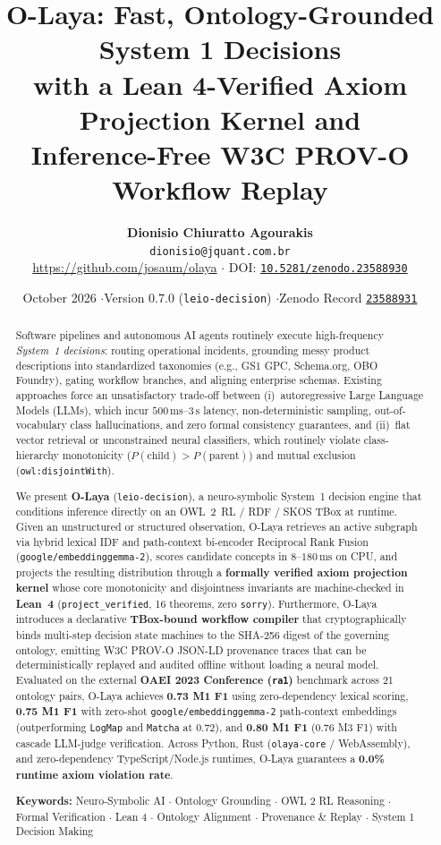 \documentclass[11pt,a4paper]{article}
\title{\textbf{O-Laya: Fast, Ontology-Grounded System 1 Decisions\\with a Lean 4-Verified Axiom Projection Kernel and\\Inference-Free W3C PROV-O Workflow Replay}}
\author{
  \textbf{Dionisio Chiuratto Agourakis}\\
  \texttt{dionisio@jquant.com.br}\\
  \url{https://github.com/josaum/olaya} $\cdot$ DOI: \href{https://doi.org/10.5281/zenodo.23588930}{\texttt{10.5281/zenodo.23588930}}
}
\date{October 2026 \quad$\cdot$\quad Version 0.7.0 (\texttt{leio-decision}) \quad$\cdot$\quad Zenodo Record \href{https://zenodo.org/records/23588931}{\texttt{23588931}}}
\begin{document}
\sloppy

\maketitle

\begin{abstract}
\noindent
Software pipelines and autonomous AI agents routinely execute high-frequency \emph{System~1 decisions}: routing operational incidents, grounding messy product descriptions into standardized taxonomies (e.g., GS1 GPC, Schema.org, OBO Foundry), gating workflow branches, and aligning enterprise schemas. Existing approaches force an unsatisfactory trade-off between (i)~autoregressive Large Language Models (LLMs), which incur $500\,\text{ms--}3\,\text{s}$ latency, non-deterministic sampling, out-of-vocabulary class hallucinations, and zero formal consistency guarantees, and (ii)~flat vector retrieval or unconstrained neural classifiers, which routinely violate class-hierarchy monotonicity ($P(\text{child}) > P(\text{parent})$) and mutual exclusion (\texttt{owl:disjointWith}).

We present \textbf{O-Laya} (\texttt{leio-decision}), a neuro-symbolic System~1 decision engine that conditions inference directly on an OWL~2~RL / RDF / SKOS TBox at runtime. Given an unstructured or structured observation, O-Laya retrieves an active subgraph via hybrid lexical IDF and path-context bi-encoder Reciprocal Rank Fusion (\texttt{google/embeddinggemma-2}), scores candidate concepts in $8\text{--}180\,\text{ms}$ on CPU, and projects the resulting distribution through a \textbf{formally verified axiom projection kernel} whose core monotonicity and disjointness invariants are machine-checked in \textbf{Lean~4} (\texttt{project\_verified}, 16 theorems, zero \texttt{sorry}). Furthermore, O-Laya introduces a declarative \textbf{TBox-bound workflow compiler} that cryptographically binds multi-step decision state machines to the SHA-256 digest of the governing ontology, emitting W3C PROV-O JSON-LD provenance traces that can be deterministically replayed and audited offline without loading a neural model. Evaluated on the external \textbf{OAEI 2023 Conference (\texttt{ra1})} benchmark across 21 ontology pairs, O-Laya achieves \textbf{0.73 M1 F1} using zero-dependency lexical scoring, \textbf{0.75 M1 F1} with zero-shot \texttt{google/embeddinggemma-2} path-context embeddings (outperforming \texttt{LogMap} and \texttt{Matcha} at $0.72$), and \textbf{0.80 M1 F1} ($0.76$ M3 F1) with cascade LLM-judge verification. Across Python, Rust (\texttt{olaya-core} / WebAssembly), and zero-dependency TypeScript/Node.js runtimes, O-Laya guarantees a \textbf{0.0\% runtime axiom violation rate}.

\vspace{0.6em}
\noindent\textbf{Keywords:} Neuro-Symbolic AI $\cdot$ Ontology Grounding $\cdot$ OWL 2 RL Reasoning $\cdot$ Formal Verification $\cdot$ Lean 4 $\cdot$ Ontology Alignment $\cdot$ Provenance \& Replay $\cdot$ System 1 Decision Making
\end{abstract}
\end{document}
